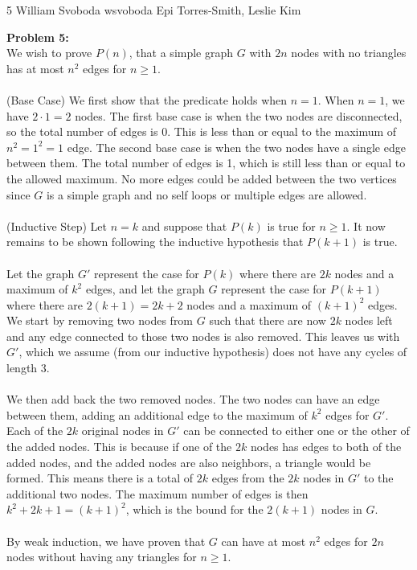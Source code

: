 \documentclass[12pt,letterpaper]{cos340hw}
\begin{document}
           {5}            %
           {William Svoboda}  %
           {wsvoboda}   %
           {Epi Torres-Smith, Leslie Kim} 




\noindent\textbf{Problem 5:}\\
We wish to prove $P(n)$, that a simple graph $G$ with $2n$ nodes with no triangles has at most $n^2$ 
edges for $n\ge1$.\\\\
(Base Case) We first show that the predicate holds when $n=1$. When $n=1$, we have $2\cdot1=2$ 
nodes. The first base case is when the two nodes are disconnected, so the total number of edges is 0. 
This is less than or equal to the maximum of $n^2 =1^2=1$ edge. The second base case is when the 
two nodes have a single edge between them. The total number of edges is 1, which is still less than or 
equal to the allowed maximum. No more edges could be added between the two vertices since $G$ is 
a simple graph and no self loops or multiple edges are allowed.\\\\
(Inductive Step) Let $n=k$ and suppose that $P(k)$ is true for $n\ge1$. It now remains to be shown 
following the inductive hypothesis that $P(k+1)$ is true.\\\\
Let the graph $G'$ represent the case for $P(k)$ where there are $2k$ nodes and a maximum of $k^2$ 
edges, and let the graph $G$ represent the case for $P(k+1)$ where there are $2(k+1)=2k+2$ nodes and 
a maximum of $(k+1)^2$ edges. We start by removing two nodes from $G$ such that there are now $2k$ 
nodes left and any edge connected to those two nodes is also removed. This leaves us with $G'$, which 
we assume (from our inductive hypothesis) does not have any cycles of length 3.\\\\
We then add back the two removed nodes. The two nodes can have an edge between them, adding an 
additional edge to the maximum of $k^2$ edges for $G'$. Each of the $2k$ original nodes in $G'$ can be 
connected to either one or the other of the added nodes. This is because if one of the $2k$ nodes has 
edges to both of the added nodes, and the added nodes are also neighbors, a triangle would be formed. 
This means there is a total of $2k$ edges from the $2k$ nodes in $G'$ to the additional two nodes. The 
maximum number of edges is then $k^2+2k+1=(k+1)^2$, which is the bound for the $2(k+1)$ nodes in $G$.\\\\
By weak induction, we have proven that $G$ can have at most $n^2$ edges for $2n$ nodes without 
having any triangles for $n\ge1$.


\end{document}
